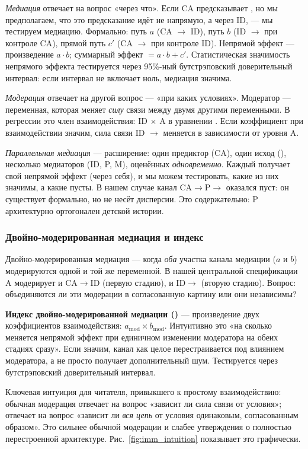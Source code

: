 \emph{Медиация} отвечает на вопрос «через что». Если CA предсказывает \EAF{}, но мы предполагаем, что это предсказание идёт не напрямую, а через ID, --- мы тестируем медиацию. Формально: путь $a$ (CA $\to$ ID), путь $b$ (ID $\to$ \EAF{} при контроле CA), прямой путь $c'$ (CA $\to$ \EAF{} при контроле ID). Непрямой эффект --- произведение $a \cdot b$; суммарный эффект $= a \cdot b + c'$. Статистическая значимость непрямого эффекта тестируется через 95\%-ный бутстрэповский доверительный интервал: если интервал не включает ноль, медиация значима.

\emph{Модерация} отвечает на другой вопрос --- «при каких условиях». Модератор --- переменная, которая меняет \emph{силу} связи между двумя другими переменными. В регрессии это член взаимодействия: ID $\times$ A в уравнении \EAF{}. Если коэффициент при взаимодействии значим, сила связи ID $\to$ \EAF{} меняется в зависимости от уровня A.

\emph{Параллельная медиация} --- расширение: один предиктор (CA), один исход (\EAF{}), несколько медиаторов (ID, P, M), оценённых \emph{одновременно}. Каждый получает свой непрямой эффект (через себя), и мы можем тестировать, какие из них значимы, а какие пусты. В нашем случае канал CA$\to$P$\to$\EAF{} оказался пуст: он существует формально, но не несёт дисперсии. Это содержательно: P архитектурно ортогонален детской истории.

\subsubsection{Двойно-модерированная медиация и индекс \IMM}

Двойно-модерированная медиация --- когда \emph{оба} участка канала медиации ($a$ и $b$) модерируются одной и той же переменной. В нашей центральной спецификации A модерирует и CA$\to$ID (первую стадию), и ID$\to$\EAF{} (вторую стадию). Вопрос: объединяются ли эти модерации в согласованную картину или они независимы?

\textbf{Индекс двойно-модерированной медиации (\IMM)} \citep{hayes2018} --- произведение двух коэффициентов взаимодействия: $a_{\text{mod}} \times b_{\text{mod}}$. Интуитивно это «на сколько меняется непрямой эффект при единичном изменении модератора на обеих стадиях сразу». Если \IMM{} значим, канал как целое перестраивается под влиянием модератора, а не просто получает дополнительный шум. Тестируется через бутстрэповский доверительный интервал.

Ключевая интуиция для читателя, привыкшего к простому взаимодействию: обычная модерация отвечает на вопрос «зависит ли сила связи от условия»; \IMM{} отвечает на вопрос «зависит ли \emph{вся цепь} от условия одинаковым, согласованным образом». Это сильнее обычной модерации и слабее утверждения о полностью перестроенной архитектуре. Рис.~\ref{fig:imm_intuition} показывает это графически.

